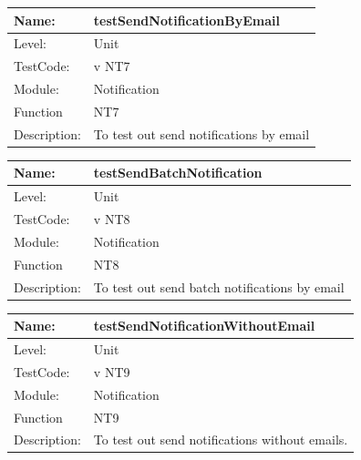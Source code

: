 \documentclass[12pt]{article}
\begin{document}
\begin{center}
\begin{tabular}{|l|p{12cm}|}
\hline

 Name: & testSendNotificationByEmail \\
\hline
Level: & Unit \\
\hline
TestCode: & v NT7 \\
\hline
Module:& Notification\\
\hline
Function & NT7 \\
\hline
Description: & To test out send notifications by email \\
\hline

\end{tabular}
\end{center}

\begin{center}
\begin{tabular}{|l|p{12cm}|}
\hline

 Name: & testSendBatchNotification \\
\hline
Level: & Unit \\
\hline
TestCode: & v NT8 \\
\hline
Module:& Notification\\
\hline
Function & NT8 \\
\hline
Description: & To test out send batch notifications by email \\
\hline

\end{tabular}
\end{center}

\begin{center}
\begin{tabular}{|l|p{12cm}|}
\hline

 Name: & testSendNotificationWithoutEmail \\
\hline
Level: & Unit \\
\hline
TestCode: & v NT9 \\
\hline
Module:& Notification\\
\hline
Function & NT9 \\
\hline
Description: & To test out send notifications without emails. \\
\hline

\end{tabular}
\end{center}
\end{document}
